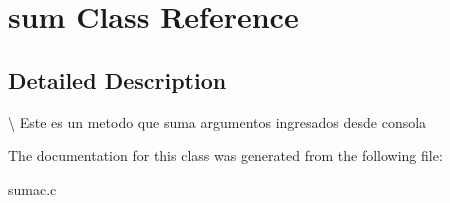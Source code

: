 \hypertarget{classsum}{\section{sum Class Reference}
\label{classsum}
}


\subsection{Detailed Description}
\textbackslash{} Este es un metodo que suma argumentos ingresados desde consola 

The documentation for this class was generated from the following file\+:\begin{DoxyCompactItemize}
\item 
sumac.\+c\end{DoxyCompactItemize}
